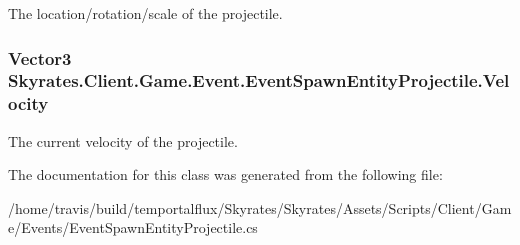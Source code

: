 The location/rotation/scale of the projectile. 

\hypertarget{class_skyrates_1_1_client_1_1_game_1_1_event_1_1_event_spawn_entity_projectile_a585b4f98f506b65fca022f40d8187c1e}{
\subsubsection[{Velocity}]{\setlength{\rightskip}{0pt plus 5cm}Vector3 Skyrates.\-Client.\-Game.\-Event.\-Event\-Spawn\-Entity\-Projectile.\-Velocity}}\label{class_skyrates_1_1_client_1_1_game_1_1_event_1_1_event_spawn_entity_projectile_a585b4f98f506b65fca022f40d8187c1e}


The current velocity of the projectile. 



The documentation for this class was generated from the following file\-:\begin{DoxyCompactItemize}
\item 
/home/travis/build/temportalflux/\-Skyrates/\-Skyrates/\-Assets/\-Scripts/\-Client/\-Game/\-Events/Event\-Spawn\-Entity\-Projectile.\-cs\end{DoxyCompactItemize}
